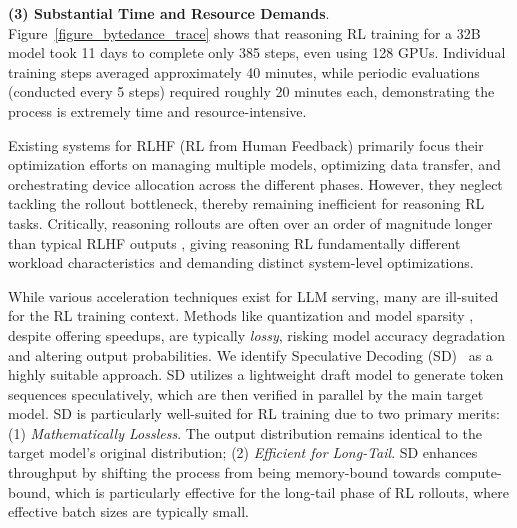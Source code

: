 \documentclass[sigplan,screen]{acmart}
\begin{document}
\noindent\textbf{(3) Substantial Time and Resource Demands}. 
Figure~\ref{figure_bytedance_trace} shows that reasoning RL training for a 32B model took 11 days to complete only 385 steps, even using 128 GPUs. Individual training steps averaged approximately 40 minutes, while periodic evaluations (conducted every 5 steps) required roughly 20 minutes each, demonstrating the process is extremely time and resource-intensive. %



Existing systems \cite{HybridFlow, RLHFuse, ReaLHF, DeepSpeedChat, GEAR, NeMoAligner, FlexRLHF} for RLHF (RL from Human Feedback)  primarily focus their optimization efforts on managing multiple models, optimizing data transfer, and orchestrating device allocation across the different phases. However, they neglect tackling the rollout bottleneck, thereby remaining inefficient for reasoning RL tasks. Critically, reasoning rollouts are often over an order of magnitude longer than typical RLHF outputs \cite{HybridFlow,RLHFuse, InstructGPT}, giving reasoning RL fundamentally different workload characteristics and demanding distinct system-level optimizations.

While various acceleration techniques exist for LLM serving, many are ill-suited for the RL training context. Methods like quantization \cite{AWQ, GPTQ} and model sparsity \cite{LLM-Pruner, StreamingLLM}, despite offering speedups, are typically \emph{lossy}, risking model accuracy degradation and altering output probabilities. 
%
We identify Speculative Decoding (SD)~\cite{SpeculativeDecoding, chen2023accelerating} as a highly suitable approach. SD utilizes a lightweight draft model to generate token sequences speculatively, which are then verified in parallel by the main target model.
SD is particularly well-suited for RL training due to two primary merits: (1) \emph{Mathematically Lossless}. The output distribution remains identical to the target model's original distribution; (2) \emph{Efficient for Long-Tail}. SD enhances throughput by shifting the process from being memory-bound towards compute-bound, which is particularly effective for the long-tail phase of RL rollouts, where effective batch sizes are typically small.
\end{document}
